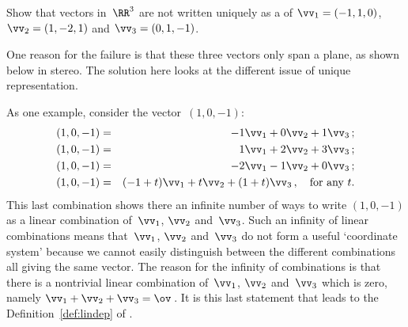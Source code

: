 \begin{example}[3D failure] \label{eg:}
Show that vectors in~\(\RR^3\) are not written uniquely as a  of \(\vv_1=(-1,1,0)\), \(\vv_2=(1,-2,1)\) and \(\vv_3=(0,1,-1)\). 

One reason for the failure is that these three vectors only span a plane, as shown below in stereo.  The solution here looks at the different issue of unique representation.
\begin{center}
\end{center}
\begin{solution} 
As one example, consider the vector~\((1,0,-1)\):
\begin{eqnarray*}
(1,0,-1)&=&-1\vv_1+0\vv_2+1\vv_3\,;
\\(1,0,-1)&=&1\vv_1+2\vv_2+3\vv_3\,;
\\(1,0,-1)&=&-2\vv_1-1\vv_2+0\vv_3\,;
\\(1,0,-1)&=&(-1+t)\vv_1+t\vv_2+(1+t)\vv_3\,,\quad\text{for any }t.
\end{eqnarray*}
This last combination shows there an infinite number of ways to write \((1,0,-1)\) as a linear combination of~\(\vv_1\), \(\vv_2\) and~\(\vv_3\).
Such an infinity of linear combinations means that~\(\vv_1\), \(\vv_2\) and~\(\vv_3\) do not form a useful `coordinate system' because we cannot easily distinguish between the different combinations all giving the same vector.
The reason for the infinity of combinations is that there is a nontrivial linear combination of~\(\vv_1\), \(\vv_2\) and~\(\vv_3\) which is zero, namely \(\vv_1+\vv_2+\vv_3=\ov\)\,.
It is this last statement that leads to the Definition~\ref{def:lindep} of .
\end{solution}
\end{example}





